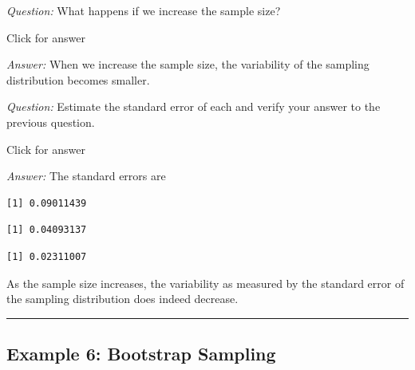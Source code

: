 \documentclass[
]{book}
\newenvironment{Shaded}{\begin{snugshade}}{\end{snugshade}}
\newcommand{\FloatTok}[1]{\textcolor[rgb]{0.00,0.00,0.81}{#1}}
\newcommand{\FunctionTok}[1]{\textcolor[rgb]{0.00,0.00,0.00}{#1}}
\newcommand{\NormalTok}[1]{#1}
\newcommand{\SpecialCharTok}[1]{\textcolor[rgb]{0.00,0.00,0.00}{#1}}
\begin{document}
\emph{Question:} What happens if we increase the sample size?

Click for answer

\emph{Answer:} When we increase the sample size, the variability of the sampling distribution becomes smaller.

\emph{Question:} Estimate the standard error of each and verify your answer to the previous question.

Click for answer

\emph{Answer:} The standard errors are

\begin{Shaded}
\end{Shaded}

\begin{verbatim}
[1] 0.09011439
\end{verbatim}

\begin{Shaded}
\end{Shaded}

\begin{verbatim}
[1] 0.04093137
\end{verbatim}

\begin{Shaded}
\end{Shaded}

\begin{verbatim}
[1] 0.02311007
\end{verbatim}

As the sample size increases, the variability as measured by the standard error of the sampling distribution does indeed decrease.

\begin{center}\rule{0.5\linewidth}{0.5pt}\end{center}

\hypertarget{example-6-bootstrap-sampling}{%
\subsection{Example 6: Bootstrap Sampling}\label{example-6-bootstrap-sampling}}
\end{document}
